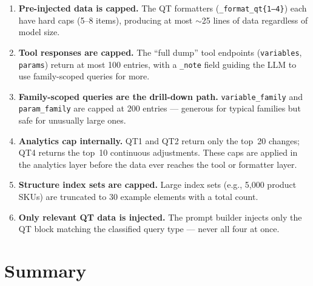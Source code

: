 \documentclass[11pt, a4paper]{article}
\begin{document}
\begin{enumerate}[leftmargin=2em]
    \item \textbf{Pre-injected data is capped.}
          The QT formatters (\texttt{\_format\_qt\{1--4\}}) each have
          hard caps (5--8 items), producing at most $\sim$25 lines of
          data regardless of model size.

    \item \textbf{Tool responses are capped.}
          The ``full dump'' tool endpoints (\texttt{variables},
          \texttt{params}) return at most 100 entries, with a
          \texttt{\_note} field guiding the LLM to use family-scoped
          queries for more.

    \item \textbf{Family-scoped queries are the drill-down path.}
          \texttt{variable\_family} and \texttt{param\_family} are capped
          at 200 entries --- generous for typical families but safe for
          unusually large ones.

    \item \textbf{Analytics cap internally.}
          QT1 and QT2 return only the top~20 changes; QT4 returns the
          top~10 continuous adjustments.  These caps are applied in the
          analytics layer before the data ever reaches the tool or
          formatter layer.

    \item \textbf{Structure index sets are capped.}
          Large index sets (e.g., 5,000 product SKUs) are truncated to
          30 example elements with a total count.

    \item \textbf{Only relevant QT data is injected.}
          The prompt builder injects only the QT block matching the
          classified query type --- never all four at once.
\end{enumerate}


\section{Summary}
\end{document}
